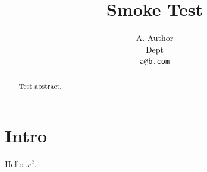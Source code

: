 \documentclass{article}
\title{Smoke Test}
\author{A. Author\\ Dept\\ \texttt{a@b.com}}
\begin{document}
\maketitle
\begin{abstract}Test abstract.\end{abstract}
\section{Intro}Hello $x^2$.
\end{document}
